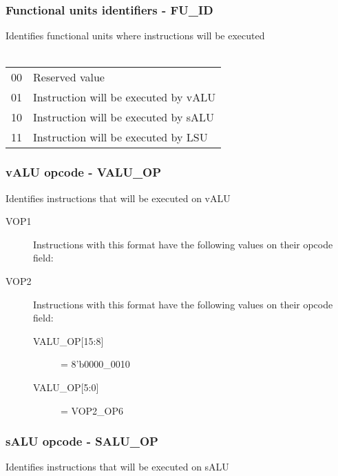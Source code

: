 \documentclass{article}
\begin{document}
\subsubsection{Functional units identifiers - FU\_ID}
Identifies functional units where instructions will be executed \\ \\
\begin{tabular}{l p{4.5in}}
00 & Reserved value \\
01 & Instruction will be executed by vALU \\
10 & Instruction will be executed by sALU \\
11 & Instruction will be executed by LSU \\
\end{tabular}

\subsubsection{vALU opcode - VALU\_OP}
Identifies instructions that will be executed on vALU
\begin{description}
\item[VOP1] Instructions with this format have the following values on their opcode field:

\item[VOP2]  Instructions with this format have the following values on their opcode field:
  \begin{description}
  \item[{VALU\_OP[15:8]}] = 8'b0000\_0010
  \item[{VALU\_OP[5:0]}] = VOP2\_OP6
  \end{description}
\end{description}

\subsubsection{sALU opcode - SALU\_OP}
Identifies instructions that will be executed on sALU
\end{document}
